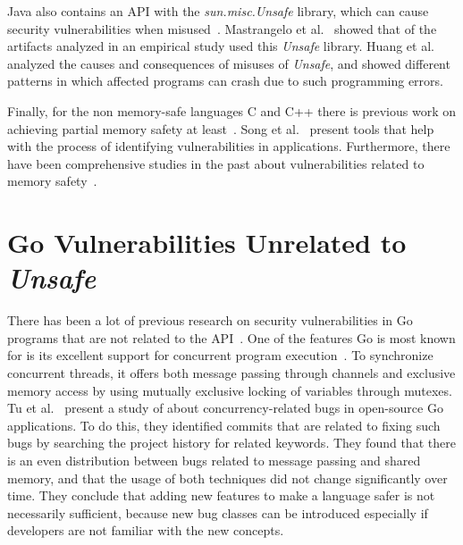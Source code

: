 Java also contains an \unsafe{} API with the \textit{sun.misc.Unsafe} library, which can cause security vulnerabilities
when misused~\cite{mastrangelo2019}.
Mastrangelo et al.~\cite{mastrangelo2015} showed that  of the artifacts analyzed in an empirical study
used this \textit{Unsafe} library.
Huang et al.~\cite{huang2019} analyzed the causes and consequences of misuses of \textit{Unsafe}, and showed different
patterns in which affected programs can crash due to such programming errors.

Finally, for the non memory-safe languages C and C++ there is previous work on achieving partial memory safety at
least~\cite{burow2018, nagarakatte2009}.
Song et al.~\cite{song2019} present tools that help with the process of identifying vulnerabilities in applications.
Furthermore, there have been comprehensive studies in the past about vulnerabilities related to memory
safety~\cite{szekeres2013,alnaeli2017,larochelle2001}.



\section{Go Vulnerabilities Unrelated to \textit{Unsafe}}\label{sec:related-work:other-go-vulnerabilities}

There has been a lot of previous research on security vulnerabilities in Go programs that are not related to the
\unsafe{} \acrshort{API}~\cite{zhou2017, hill2002, hannan1998, choi1999}.
One of the features Go is most known for is its excellent support for concurrent program execution~\cite{donovan2015}.
To synchronize concurrent threads, it offers both message passing through channels and exclusive memory access by using
mutually exclusive locking of variables through mutexes.
Tu et al.~\cite{tu2019} present a study of about  concurrency-related bugs in  open-source
Go applications.
To do this, they identified commits that are related to fixing such bugs by searching the project history for related
keywords.
They found that there is an even distribution between bugs related to message passing and shared memory, and that the
usage of both techniques did not change significantly over time.
They conclude that adding new features to make a language safer is not necessarily sufficient, because new bug classes
can be introduced especially if developers are not familiar with the new concepts.

